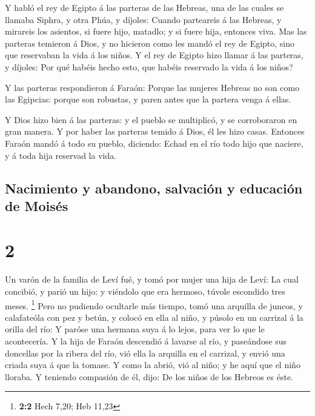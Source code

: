  Y habló el rey de Egipto á las parteras de las Hebreas,
una de las cuales se llamaba Siphra, y otra Phúa, y díjoles:
 Cuando parteareis á las Hebreas, y mirareis los
asientos, si fuere hijo, matadlo; y si fuere hija, entonces viva.
 Mas las parteras temieron á Dios, y no hicieron como les
mandó el rey de Egipto, sino que reservaban la vida á los niños.
 Y el rey de Egipto hizo llamar á las parteras, y
díjoles: Por qué habéis hecho esto, que habéis reservado la vida á los
niños?

 Y las parteras respondieron á Faraón: Porque las mujeres
Hebreas no son como las Egipcias: porque son robustas, y paren antes que
la partera venga á ellas.

 Y Dios hizo bien á las parteras: y el pueblo se
multiplicó, y se corroboraron en gran manera.  Y por
haber las parteras temido á Dios, él les hizo casas. 
Entonces Faraón mandó á todo su pueblo, diciendo: Echad en el río todo
hijo que naciere, y á toda hija reservad la vida.

\hypertarget{nacimiento-y-abandono-salvaciuxf3n-y-educaciuxf3n-de-moisuxe9s}{%
\subsection{Nacimiento y abandono, salvación y educación de
Moisés}\label{nacimiento-y-abandono-salvaciuxf3n-y-educaciuxf3n-de-moisuxe9s}}

\hypertarget{section-1}{%
\section{2}\label{section-1}}

 Un varón de la familia de Leví fué, y tomó por mujer una
hija de Leví:  La cual concibió, y parió un hijo: y
viéndolo que era hermoso, túvole escondido tres meses. \footnote{\textbf{2:2}
  Hech 7,20; Heb 11,23}  Pero no pudiendo ocultarle más
tiempo, tomó una arquilla de juncos, y calafateóla con pez y betún, y
colocó en ella al niño, y púsolo en un carrizal á la orilla del río:
 Y paróse una hermana suya á lo lejos, para ver lo que le
acontecería.  Y la hija de Faraón descendió á lavarse al
río, y paseándose sus doncellas por la ribera del río, vió ella la
arquilla en el carrizal, y envió una criada suya á que la tomase.
 Y como la abrió, vió al niño; y he aquí que el niño
lloraba. Y teniendo compasión de él, dijo: De los niños de los Hebreos
es éste.

